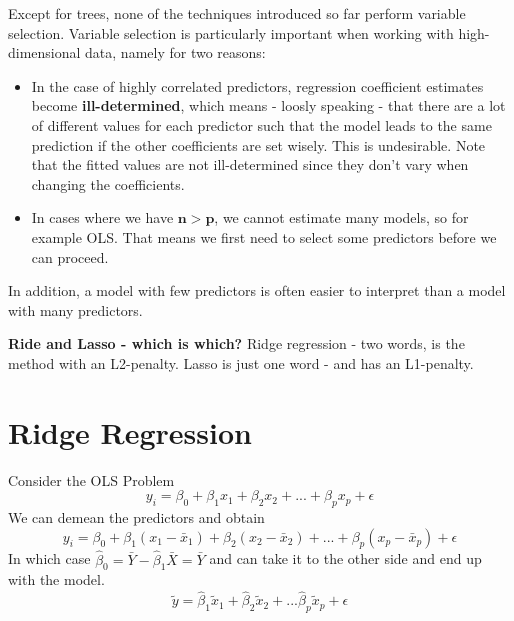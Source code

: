 \documentclass[]{book}
\providecommand{\tightlist}{%
  \setlength{\itemsep}{0pt}\setlength{\parskip}{0pt}}
\begin{document}
Except for trees, none of the techniques introduced so far perform
variable selection. Variable selection is particularly important when
working with high-dimensional data, namely for two reasons:

\begin{itemize}
\tightlist
\item
  In the case of highly correlated predictors, regression coefficient
  estimates become \textbf{ill-determined}, which means - loosly
  speaking - that there are a lot of different values for each predictor
  such that the model leads to the same prediction if the other
  coefficients are set wisely. This is undesirable. Note that the fitted
  values are not ill-determined since they don't vary when changing the
  coefficients.
\item
  In cases where we have \textbf{\(\mathbf{n}> \mathbf{p}\)}, we cannot
  estimate many models, so for example OLS. That means we first need to
  select some predictors before we can proceed.
\end{itemize}

In addition, a model with few predictors is often easier to interpret
than a model with many predictors.

\textbf{Ride and Lasso - which is which?} Ridge regression - two words,
is the method with an L2-penalty. Lasso is just one word - and has an
L1-penalty.

\section{Ridge Regression}\label{ridge-regression}

Consider the OLS Problem
\[y_i = \beta_0 + \beta_1 x_1 + \beta_2 x_2 + ... + \beta_p x_p +  \epsilon\]
We can demean the predictors and obtain
\[y_i = \beta_0 + \beta_1(x_1 - \bar{x}_1) + \beta_2(x_2 - \bar{x}_2) + ... 
+ \beta_p(x_p - \bar{x}_p) + \epsilon\] In which case
\(\hat{\beta}_0 = \bar{Y} - \hat{\beta}_1\bar{X} = \bar{Y}\) and can
take it to the other side and end up with the model.
\[\tilde{y} = \hat{\beta}_1 \tilde{x}_1 + \hat{\beta}_2 \tilde{x}_2 + 
... \hat{\beta}_p \tilde{x}_p +\epsilon\]
\end{document}
